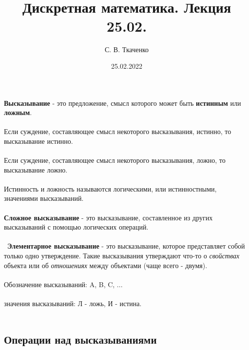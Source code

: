 \documentclass{article}
\title{Дискретная математика. Лекция 25.02.}
\author{С. В. Ткаченко}
\date{25.02.2022}
\begin{document}
	\maketitle
	\textbf{Высказывание} - это предложение, смысл которого может быть
	\textbf{истинным} или \textbf{ложным}.
	\\\\
	Если суждение, составляющее смысл некоторого высказывания, истинно,
	то высказывание истинно.
	\\\\
	Если суждение, составляющее смысл некоторого высказывания, ложно,
	то высказывание ложно.
	\\\\
	Истинность и ложность называются логическими, или истинностными,
	значениями высказываний.
	\\\\
	\textbf{Сложное высказывание} - это высказывание, составленное из
	других высказываний с помощью логических операций.
	\\\\\
	\textbf{Элементарное высказывание} - это высказывание, которое
	представляет собой только одно утверждение. Такие высказывания
	утверждают что-то о \textit{свойствах} объекта или об \textit{отношениях}
	между объектами (чаще всего - двумя).
	\\\\
	Обозначение высказываний: A, B, C, ...
	\\\\
	значения высказываний: Л - ложь, И - истина.
	\\\\
	
	\begin{center}
		\subsection*{Операции над высказываниями}
	\end{center}
	
\end{document}
